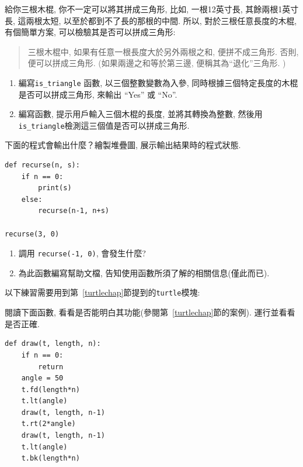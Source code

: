 \documentclass[10pt]{book}
\begin{document}
\begin{exercise}

給你三根木棍, 你不一定可以將其拼成三角形, 比如, 一根12英寸長, 
其餘兩根1英寸長, 這兩根太短, 以至於都到不了長的那根的中間. 
所以, 對於三根任意長度的木棍, 有個簡單方案, 可以檢驗其是否可以拼成三角形:

\begin{quotation}
三根木棍中, 如果有任意一根長度大於另外兩根之和, 便拼不成三角形. 
否則, 便可以拼成三角形. (如果兩邊之和等於第三邊, 便稱其為``退化''三角形. )
\end{quotation}

\begin{enumerate}

\item 編寫\verb"is_triangle" 函數, 以三個整數變數為入參, 
同時根據三個特定長度的木棍是否可以拼成三角形, 來輸出 ``Yes'' 或 ``No''. 

\item 編寫函數, 提示用戶輸入三個木棍的長度, 並將其轉換為整數, 
然後用\verb"is_triangle"檢測這三個值是否可以拼成三角形. 
\end{enumerate}

\end{exercise}

\begin{exercise}
下面的程式會輸出什麼？繪製堆疊圖, 展示輸出結果時的程式狀態.

\begin{verbatim}
def recurse(n, s):
    if n == 0:
        print(s)
    else:
        recurse(n-1, n+s)

recurse(3, 0)
\end{verbatim}

\begin{enumerate}

\item 調用 {\tt  recurse(-1, 0)}, 會發生什麼?

\item 為此函數編寫幫助文檔, 告知使用函數所須了解的相關信息(僅此而已).

\end{enumerate}

\end{exercise}

以下練習需要用到第~\ref{turtlechap}節提到的{\tt turtle}模塊:

\begin{exercise}
閱讀下面函數, 看看是否能明白其功能(參閱第~\ref{turtlechap}節的案例). 
運行並看看是否正確. 

\begin{verbatim}
def draw(t, length, n):
    if n == 0:
        return
    angle = 50
    t.fd(length*n)
    t.lt(angle)
    draw(t, length, n-1)
    t.rt(2*angle)
    draw(t, length, n-1)
    t.lt(angle)
    t.bk(length*n)
\end{verbatim}

\end{exercise}
\end{document}
